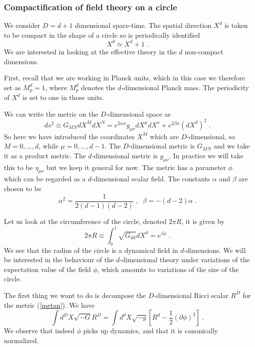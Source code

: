 \documentclass[11pt,a4paper]{article}
\numberwithin{equation}{section}
\numberwithin{table}{section}\setlength{\multlinegap}{25pt}
\newcommand{\be}{\begin{equation}}
\newcommand{\ee}{\end{equation}}
\begin{document}
\subsubsection{Compactification of field theory on a circle}
\label{sec:compft}

We consider $D=d+1$ dimensional space-time. The spatial direction $X^d$ is taken to be compact in the shape of a circle so is periodically identified
\be
X^d \simeq X^d + 1 \;.
\ee
We are interested in looking at the effective theory in the $d$ non-compact dimensions. 

First, recall that we are working in Planck units, which in this case we therefore set as $M_p^d=1$, where $M_p^d$ denotes the $d$-dimensional Planck mass. The periodicity of $X^d$ is set to one in those units.  

We can write the metric on the $D$-dimensional space as
\be
ds^2 \equiv G_{MN} dX^M dX^N = e^{2\alpha\phi}g_{\mu\nu} dX^{\mu} dX^{\nu} + e^{2 \beta\phi} \left( dX^d\right)^2 \;.
\label{metan}
\ee
So here we have introduced the coordinates $X^M$ which are $D$-dimensional, so $M=0,...,d$, while $\mu=0,...,d-1$. The $D$-dimensional metric is $G_{MN}$ and we take it as a product metric. The $d$-dimensional metric is $g_{\mu\nu}$. In practice we will take this to be $\eta_{\mu\nu}$ but we keep it general for now. The metric has a parameter $\phi$ which can be regarded as a $d$-dimensional scalar field. 
The constants $\alpha$ and $\beta$ are chosen to be
\be
\alpha^2 = \frac{1}{2\left(d-1\right)\left(d-2\right)} \;,\;\; \beta = -\left(d-2\right)\alpha \;.
\ee

Let us look at the circumference of the circle, denoted $2\pi R$, it is given by
\be
2\pi R \equiv \int_0^{1} \sqrt{G_{dd}} dX^d = e^{\beta \phi} \;.
\label{Rphi} 
\ee
We see that the radius of the circle is a dynamical field in $d$-dimensions. We will be interested in the behaviour of the $d$-dimensional theory under variations of the expectation value of the field $\phi$, which amounts to variations of the size of the circle.

The first thing we want to do is decompose the $D$-dimensional Ricci scalar $R^D$ for the metric (\ref{metan}). We have
\be
\int d^DX \sqrt{-G}R^D = \int d^dX \sqrt{-g} \left[R^d - \frac12\left(\partial \phi \right)^2 \right] \;.
\label{ddim} 
\ee
We observe that indeed $\phi$ picks up dynamics, and that it is canonically normalized. 
\end{document}
